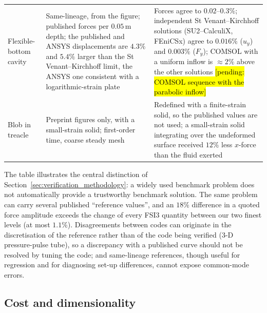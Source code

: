 \begin{table}[htbp]
\begin{tabular}{p{2.8cm}p{5.8cm}p{5.0cm}}
		Flexible-bottom cavity & Same-lineage, from the figure; published forces per $0.05\,\mathrm{m}$ depth; the published and ANSYS displacements are $4.3\%$ and $5.4\%$ larger than the St Venant--Kirchhoff limit, the ANSYS one consistent with a logarithmic-strain plate & Forces agree to $0.02$--$0.3\%$; independent St Venant--Kirchhoff solutions (SU2--CalculiX, FEniCSx) agree to $0.016\%$ ($u_y$) and $0.003\%$ ($F_y$); COMSOL with a uniform inflow is $\approx2\%$ above the other solutions \hl{[pending: COMSOL sequence with the parabolic inflow]} \\
		Blob in treacle & Preprint figures only, with a small-strain solid; first-order time, coarse steady mesh & Redefined with a finite-strain solid, so the published values are not used; a small-strain solid integrating over the undeformed surface received $12\%$ less $x$-force than the fluid exerted \\
		\bottomrule
	\end{tabular}
\end{table}

The table illustrates the central distinction of Section~\ref{sec:verification_methodology}: a widely used benchmark problem does not automatically provide a trustworthy benchmark solution.
The same problem can carry several published ``reference values'', and an $18\%$ difference in a quoted force amplitude exceeds the change of every FSI3 quantity between our two finest levels (at most $1.1\%$).
Disagreements between codes can originate in the discretisation of the reference rather than of the code being verified (3-D pressure-pulse tube), so a discrepancy with a published curve should not be resolved by tuning the code; and same-lineage references, though useful for regression and for diagnosing set-up differences, cannot expose common-mode errors.

\subsection{Cost and dimensionality}\label{sec:cost}

